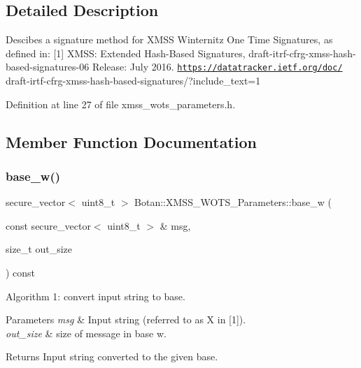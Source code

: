 \subsection{Detailed Description}
Descibes a signature method for X\+M\+SS Winternitz One Time Signatures, as defined in\+: \mbox{[}1\mbox{]} X\+M\+SS\+: Extended Hash-\/\+Based Signatures, draft-\/itrf-\/cfrg-\/xmss-\/hash-\/based-\/signatures-\/06 Release\+: July 2016. \href{https://datatracker.ietf.org/doc/}{\tt https\+://datatracker.\+ietf.\+org/doc/} draft-\/irtf-\/cfrg-\/xmss-\/hash-\/based-\/signatures/?include\+\_\+text=1 

Definition at line 27 of file xmss\+\_\+wots\+\_\+parameters.\+h.



\subsection{Member Function Documentation}
\mbox{\label{class_botan_1_1_x_m_s_s___w_o_t_s___parameters_a9e0a602c991a69061c24d062363d43a7}} 
\subsubsection{\texorpdfstring{base\+\_\+w()}{base\_w()}}
{\footnotesize\ttfamily secure\+\_\+vector$<$ uint8\+\_\+t $>$ Botan\+::\+X\+M\+S\+S\+\_\+\+W\+O\+T\+S\+\_\+\+Parameters\+::base\+\_\+w (\begin{DoxyParamCaption}\item[{const secure\+\_\+vector$<$ uint8\+\_\+t $>$ \&}]{msg,  }\item[{size\+\_\+t}]{out\+\_\+size }\end{DoxyParamCaption}) const}

Algorithm 1\+: convert input string to base.


\begin{DoxyParams}{Parameters}
{\em msg} & Input string (referred to as X in \mbox{[}1\mbox{]}). \\
\hline
{\em out\+\_\+size} & size of message in base w.\\
\hline
\end{DoxyParams}
\begin{DoxyReturn}{Returns}
Input string converted to the given base. 
\end{DoxyReturn}


